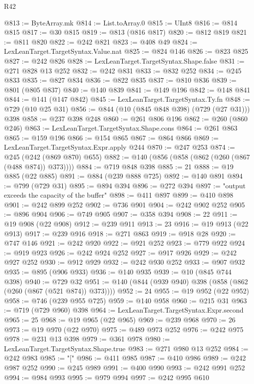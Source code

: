 \begin{lexlean}{R42}
\begin{coremodule}
@813 := ByteArray.mk
@814 := List.toArray.{0}
@815 := UInt8
@816 := @814 @815
@817 := @30 @815
@819 := @813 (@816 @817)
@820 := @812 @819
@821 := @811 @820
@822 := @242 @821
@823 := @408 @49
@824 := LexLeanTarget.TargetSyntax.Value.nat
@825 := @824 @146
@826 := @823 @825
@827 := @242 @826
@828 := LexLeanTarget.TargetSyntax.Shape.false
@831 := @271 @828 @13 @252
@832 := @242 @831
@833 := @832 @252
@834 := @245 @833
@835 := @827 @834
@836 := @822 @835
@837 := @810 @836
@839 := @801 (@805 @837)
@840 := @140 @839
@841 := @149 @196
@842 := @148 @841
@844 := @141 (@147 @842)
@845 := LexLeanTarget.TargetSyntax.Ty.fn
@848 := @729 (@10 @25 @31)
@856 := @844 (@10 (@845 @848 @398) (@729 (@27 @31))) @398
@858 := @237 @398 @248
@860 := @261 @806 @196
@862 := @260 (@860 @246)
@863 := LexLeanTarget.TargetSyntax.Shape.cons
@864 := @261 @863
@865 := @159 @196
@866 := @154 @865
@867 := @864 @866
@869 := LexLeanTarget.TargetSyntax.Expr.apply @244
@870 := @247 @253
@874 := @245 (@242 (@869 @870) @655)
@882 := @140 (@856 (@858 (@862 (@260 (@867 (@488 @874)) @373))))
@884 := @719 @848 @398
@885 := 21
@888 := @19 @885 (@22 @885)
@891 := @884 (@239 @888 @725)
@892 := @140 @891
@894 := @799 (@729 @31)
@895 := @894 @394
@896 := @272 @394
@897 := "output exceeds the capacity of the buffer"
@898 := @411 @897
@899 := @410 @898
@901 := @242 @899 @252
@902 := @736 @901
@904 := @242 @902 @252
@905 := @896 @904
@906 := @749 @905
@907 := @358 @394
@908 := 22
@911 := @19 @908 (@22 @908)
@912 := @239 @911
@913 := 23
@916 := @19 @913 (@22 @913)
@917 := @239 @916
@918 := @271 @863
@919 := @918 @28
@920 := @747 @146
@921 := @242 @920
@922 := @921 @252
@923 := @779 @922
@924 := @919 @923
@926 := @242 @924 @252
@927 := @917 @926
@929 := @242 @927 @252
@930 := @912 @929
@932 := @242 @930 @252
@933 := @907 @932
@935 := @895 (@906 @933)
@936 := @140 @935
@939 := @10 (@845 @744 @398)
@940 := @729 @32
@951 := @140 (@844 (@939 @940) @398 (@858 (@862 (@260 (@867 (@521 @874)) @373))))
@952 := 24
@955 := @19 @952 (@22 @952)
@958 := @746 (@239 @955 @725)
@959 := @140 @958
@960 := @215 @31
@963 := @719 (@729 @960) @398
@964 := LexLeanTarget.TargetSyntax.Expr.second
@965 := 25
@968 := @19 @965 (@22 @965)
@969 := @239 @968
@970 := 26
@973 := @19 @970 (@22 @970)
@975 := @489 @973 @252
@976 := @242 @975
@978 := @231 @13 @398
@979 := @361 @978
@980 := LexLeanTarget.TargetSyntax.Shape.true
@983 := @271 @980 @13 @252
@984 := @242 @983
@985 := "["
@986 := @411 @985
@987 := @410 @986
@989 := @242 @987 @252
@990 := @245 @989
@991 := @400 @990
@993 := @242 @991 @252
@994 := @984 @993
@995 := @979 @994
@997 := @242 @995 @610

\end{coremodule}
\end{lexlean}

